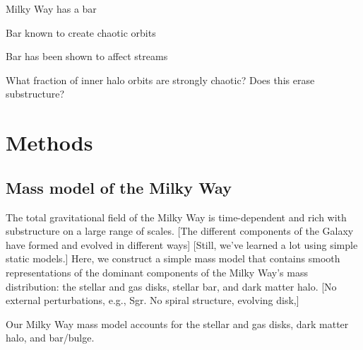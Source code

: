 \documentclass[modern]{aastex61}
\begin{document}
Milky Way has a bar

Bar known to create chaotic orbits

Bar has been shown to affect streams

What fraction of inner halo orbits are strongly chaotic?
Does this erase substructure?

\section{Methods} \label{sec:methods}

\subsection{Mass model of the Milky Way} \label{sec:potential}

The total gravitational field of the Milky Way is time-dependent and rich with
substructure on a large range of scales.
[The different components of the Galaxy have formed and evolved in different
ways]
[Still, we've learned a lot using simple static models.]
Here, we construct a simple mass model that contains smooth representations of
the dominant components of the Milky Way's mass distribution: the stellar and
gas disks, stellar bar, and dark matter halo.
[No external perturbations, e.g., Sgr. No spiral structure, evolving disk,]

Our Milky Way mass model accounts for the stellar and gas disks, dark matter
halo, and bar/bulge.
\end{document}
